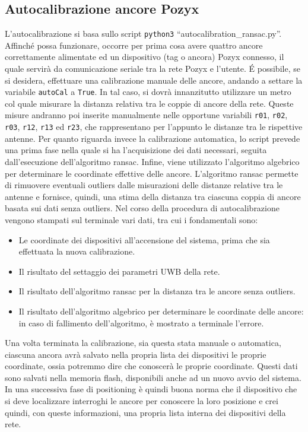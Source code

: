 \subsection{Autocalibrazione ancore Pozyx}
\label{sez:Autocalibrazione}
L'autocalibrazione si basa sullo script \texttt{python3} ``autocalibration\_ransac.py''. 
Affinché possa funzionare, occorre per prima cosa avere quattro ancore correttamente alimentate ed un dispositivo (tag o ancora) Pozyx connesso, il quale servirà da comunicazione seriale tra la rete Pozyx e l’utente. 
É possibile, se si desidera, effettuare una calibrazione manuale delle ancore, andando a settare la variabile \verb|autoCal| a \verb|True|. 
In tal caso, si dovrà innanzitutto utilizzare un metro col quale misurare la distanza relativa tra le coppie di ancore della rete. 
Queste misure andranno poi inserite manualmente  nelle opportune variabili \texttt{r01}, \texttt{r02}, \texttt{r03}, \texttt{r12}, \texttt{r13} ed \texttt{r23}, che rappresentano per l'appunto le distanze tra le rispettive antenne.
Per quanto riguarda invece la calibrazione automatica, lo script prevede una prima fase nella quale si ha l'acquisizione dei dati necessari, seguita dall'esecuzione dell’algoritmo ransac. 
Infine, viene utilizzato l’algoritmo algebrico per determinare le coordinate effettive delle ancore. 
L’algoritmo ransac permette di rimuovere eventuali outliers dalle misurazioni delle distanze relative tra le antenne e fornisce, quindi, una stima della distanza
tra ciascuna coppia di ancore basata sui dati senza outliers.
Nel corso della procedura di autocalibrazione vengono stampati sul terminale vari dati, tra cui i fondamentali sono:
\begin{itemize}
	\item Le coordinate dei dispositivi all’accensione del sistema, prima che sia effettuata la nuova calibrazione.
	
	\item Il risultato del settaggio dei parametri UWB della rete.
	
	\item Il risultato dell’algoritmo ransac per la distanza tra le ancore senza outliers.
	
	\item Il risultato dell'algoritmo algebrico per determinare le coordinate delle ancore: in caso di fallimento dell'algoritmo, è mostrato a terminale l'errore.
\end{itemize}

Una volta terminata la calibrazione, sia questa stata manuale o automatica, ciascuna ancora avrà
salvato nella propria lista dei dispositivi le proprie coordinate, ossia potremmo dire che conoscerà le proprie coordinate. 
Questi dati sono salvati nella memoria flash, disponibili anche ad un nuovo avvio del sistema.
In una successiva fase di positioning è quindi buona norma che il dispositivo che si deve localizzare interroghi le ancore per conoscere la loro posizione e crei quindi, con queste informazioni, una propria lista interna dei dispositivi della rete.

